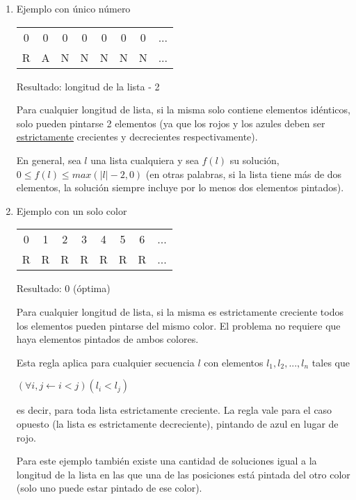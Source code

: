 	\begin{enumerate}
		\item Ejemplo con único número

		\begin{tabular}{ c c c c c c c c }
			0 & 0 & 0 & 0 & 0 & 0 & 0 & ... \\
			R & A & N & N & N & N & N & ... \\
		\end{tabular}

		Resultado: longitud de la lista - 2

		Para cualquier longitud de lista, si la misma solo contiene elementos idénticos, solo pueden pintarse 2 elementos (ya que los rojos y los azules deben ser \underline{estrictamente} crecientes y decrecientes respectivamente).

		En general, sea $l$ una lista cualquiera y sea $f(l)$ su solución,  $0 \leq f(l) \leq max(|l| - 2, 0)$ (en otras palabras, si la lista tiene más de dos elementos, la solución siempre incluye por lo menos dos elementos pintados).

		\item Ejemplo con un solo color

		\begin{tabular}{ c c c c c c c c }
			0 & 1 & 2 & 3 & 4 & 5 & 6 & ... \\
			R & R & R & R & R & R & R & ... \\
		\end{tabular}

		Resultado: 0 (óptima)

		Para cualquier longitud de lista, si la misma es estrictamente creciente todos los elementos pueden pintarse del mismo color. El problema no requiere que haya elementos pintados de ambos colores.

		Esta regla aplica para cualquier secuencia $l$ con elementos $l_1, l_2, ..., l_n$ tales que

		\begin{center}
			$(\forall i, j \leftarrow i < j)(l_i < l_j)$
		\end{center}

		es decir, para toda lista estrictamente creciente. La regla vale para el caso opuesto (la lista es estrictamente decreciente), pintando de azul en lugar de rojo.

		Para este ejemplo también existe una cantidad de soluciones igual a la longitud de la lista en las que una de las posiciones está pintada del otro color (solo uno puede estar pintado de ese color).
	\end{enumerate}
